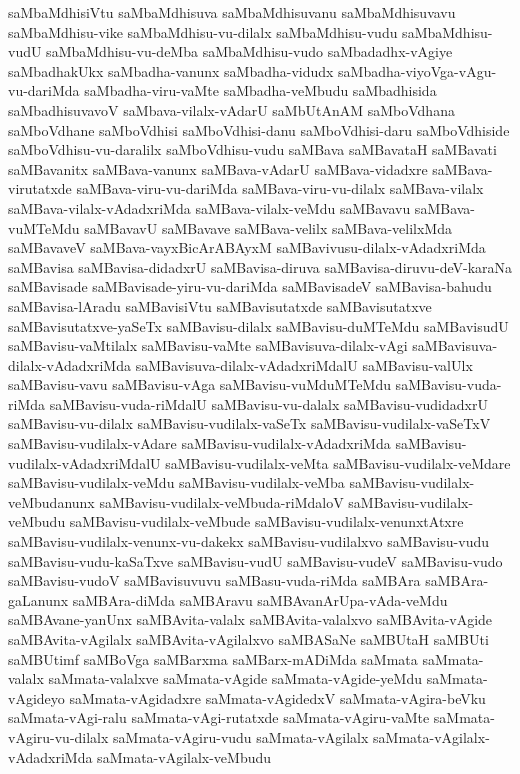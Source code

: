 {saMbaMdhisiVtu
saMbaMdhisuva
saMbaMdhisuvanu
saMbaMdhisuvavu
saMbaMdhisu-vike
saMbaMdhisu-vu-dilalx
saMbaMdhisu-vudu
saMbaMdhisu-vudU
saMbaMdhisu-vu-deMba
saMbaMdhisu-vudo
saMbadadhx-vAgiye
saMbadhakUkx
saMbadha-vanunx
saMbadha-vidudx
saMbadha-viyoVga-vAgu-vu-dariMda
saMbadha-viru-vaMte
saMbadha-veMbudu
saMbadhisida
saMbadhisuvavoV
saMbava-vilalx-vAdarU
saMbUtAnAM
saMboVdhana
saMboVdhane
saMboVdhisi
saMboVdhisi-danu
saMboVdhisi-daru
saMboVdhiside
saMboVdhisu-vu-daralilx
saMboVdhisu-vudu
saMBava
saMBavataH
saMBavati
saMBavanitx
saMBava-vanunx
saMBava-vAdarU
saMBava-vidadxre
saMBava-virutatxde
saMBava-viru-vu-dariMda
saMBava-viru-vu-dilalx
saMBava-vilalx
saMBava-vilalx-vAdadxriMda
saMBava-vilalx-veMdu
saMBavavu
saMBava-vuMTeMdu
saMBavavU
saMBavave
saMBava-velilx
saMBava-velilxMda
saMBavaveV
saMBava-vayxBicArABAyxM
saMBavivusu-dilalx-vAdadxriMda
saMBavisa
saMBavisa-didadxrU
saMBavisa-diruva
saMBavisa-diruvu-deV-karaNa
saMBavisade
saMBavisade-yiru-vu-dariMda
saMBavisadeV
saMBavisa-bahudu
saMBavisa-lAradu
saMBavisiVtu
saMBavisutatxde
saMBavisutatxve
saMBavisutatxve-yaSeTx
saMBavisu-dilalx
saMBavisu-duMTeMdu
saMBavisudU
saMBavisu-vaMtilalx
saMBavisu-vaMte
saMBavisuva-dilalx-vAgi
saMBavisuva-dilalx-vAdadxriMda
saMBavisuva-dilalx-vAdadxriMdalU
saMBavisu-valUlx
saMBavisu-vavu
saMBavisu-vAga
saMBavisu-vuMduMTeMdu
saMBavisu-vuda-riMda
saMBavisu-vuda-riMdalU
saMBavisu-vu-dalalx
saMBavisu-vudidadxrU
saMBavisu-vu-dilalx
saMBavisu-vudilalx-vaSeTx
saMBavisu-vudilalx-vaSeTxV
saMBavisu-vudilalx-vAdare
saMBavisu-vudilalx-vAdadxriMda
saMBavisu-vudilalx-vAdadxriMdalU
saMBavisu-vudilalx-veMta
saMBavisu-vudilalx-veMdare
saMBavisu-vudilalx-veMdu
saMBavisu-vudilalx-veMba
saMBavisu-vudilalx-veMbudanunx
saMBavisu-vudilalx-veMbuda-riMdaloV
saMBavisu-vudilalx-veMbudu
saMBavisu-vudilalx-veMbude
saMBavisu-vudilalx-venunxtAtxre
saMBavisu-vudilalx-venunx-vu-dakekx
saMBavisu-vudilalxvo
saMBavisu-vudu
saMBavisu-vudu-kaSaTxve
saMBavisu-vudU
saMBavisu-vudeV
saMBavisu-vudo
saMBavisu-vudoV
saMBavisuvuvu
saMBasu-vuda-riMda
saMBAra
saMBAra-gaLanunx
saMBAra-diMda
saMBAravu
saMBAvanArUpa-vAda-veMdu
saMBAvane-yanUnx
saMBAvita-valalx
saMBAvita-valalxvo
saMBAvita-vAgide
saMBAvita-vAgilalx
saMBAvita-vAgilalxvo
saMBASaNe
saMBUtaH
saMBUti
saMBUtimf
saMBoVga
saMBarxma
saMBarx-mADiMda
saMmata
saMmata-valalx
saMmata-valalxve
saMmata-vAgide
saMmata-vAgide-yeMdu
saMmata-vAgideyo
saMmata-vAgidadxre
saMmata-vAgidedxV
saMmata-vAgira-beVku
saMmata-vAgi-ralu
saMmata-vAgi-rutatxde
saMmata-vAgiru-vaMte
saMmata-vAgiru-vu-dilalx
saMmata-vAgiru-vudu
saMmata-vAgilalx
saMmata-vAgilalx-vAdadxriMda
saMmata-vAgilalx-veMbudu
}
